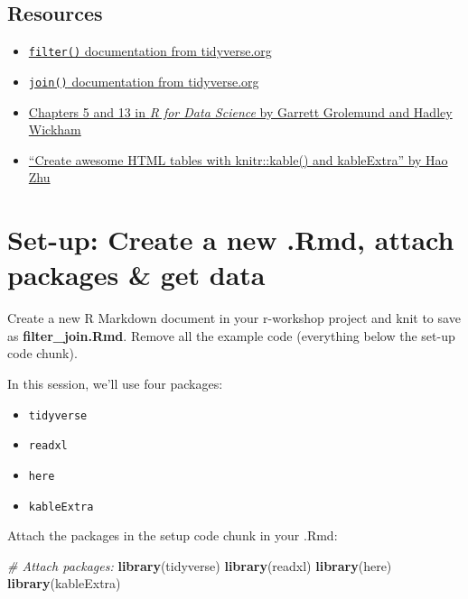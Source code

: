 \documentclass[]{book}
\newenvironment{Shaded}{\begin{snugshade}}{\end{snugshade}}
\newcommand{\CommentTok}[1]{\textcolor[rgb]{0.56,0.35,0.01}{\textit{#1}}}
\newcommand{\KeywordTok}[1]{\textcolor[rgb]{0.13,0.29,0.53}{\textbf{#1}}}
\newcommand{\NormalTok}[1]{#1}
\providecommand{\tightlist}{%
  \setlength{\itemsep}{0pt}\setlength{\parskip}{0pt}}
\begin{document}
\hypertarget{resources-6}{%
\subsection{Resources}\label{resources-6}}

\begin{itemize}
\tightlist
\item
  \href{https://dplyr.tidyverse.org/reference/filter.html}{\texttt{filter()} documentation from tidyverse.org}
\item
  \href{https://dplyr.tidyverse.org/reference/join.html}{\texttt{join()} documentation from tidyverse.org}
\item
  \href{https://r4ds.had.co.nz/}{Chapters 5 and 13 in \emph{R for Data Science} by Garrett Grolemund and Hadley Wickham}
\item
  \href{https://cran.r-project.org/web/packages/kableExtra/vignettes/awesome_table_in_html.html}{``Create awesome HTML tables with knitr::kable() and kableExtra'' by Hao Zhu}
\end{itemize}

\hypertarget{set-up-create-a-new-.rmd-attach-packages-get-data}{%
\section{Set-up: Create a new .Rmd, attach packages \& get data}\label{set-up-create-a-new-.rmd-attach-packages-get-data}}

Create a new R Markdown document in your r-workshop project and knit to save as \textbf{filter\_join.Rmd}. Remove all the example code (everything below the set-up code chunk).

In this session, we'll use four packages:

\begin{itemize}
\tightlist
\item
  \texttt{tidyverse}
\item
  \texttt{readxl}
\item
  \texttt{here}
\item
  \texttt{kableExtra}
\end{itemize}

Attach the packages in the setup code chunk in your .Rmd:

\begin{Shaded}
\begin{Highlighting}[]
\CommentTok{# Attach packages:}
\KeywordTok{library}\NormalTok{(tidyverse)}
\KeywordTok{library}\NormalTok{(readxl)}
\KeywordTok{library}\NormalTok{(here)}
\KeywordTok{library}\NormalTok{(kableExtra)}
\end{Highlighting}
\end{Shaded}
\end{document}
